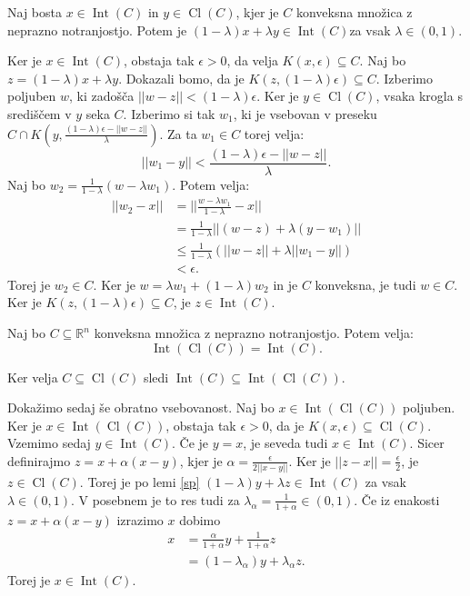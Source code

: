 \documentclass[mat1]{fmfdelo}
\newcommand{\R}{\mathbb R}
\DeclareMathOperator{\Int}{Int}
\DeclareMathOperator{\Cl}{Cl}
\begin{document}
\begin{lema}\label{sp}
	Naj bosta $x \in \Int(C)$ in $y \in \Cl(C)$, kjer je $C$ konveksna množica z neprazno notranjostjo. Potem je $(1-\lambda)x + \lambda y \in \Int(C) $za vsak $\lambda \in (0,1).$
\end{lema}

\begin{dokaz}
	Ker je $x \in \Int(C)$, obstaja tak $\epsilon > 0$, da velja $K(x, \epsilon) \subseteq C$. Naj bo $z = (1-\lambda)x + \lambda y$. Dokazali bomo, da je $K(z, (1-\lambda)\epsilon) \subseteq C$. Izberimo poljuben $w$, ki zadošča $||w-z|| < (1-\lambda)\epsilon$. Ker je $y\in \Cl(C)$, vsaka krogla s središčem v $y$ seka $C$. Izberimo si tak $w_1$, ki je vsebovan v preseku $C \cap K(y, \frac{(1-\lambda)\epsilon-||w-z||}{\lambda})$. Za ta $w_1 \in C$ torej velja:
	$$ ||w_1 - y|| < \frac{(1-\lambda)\epsilon - ||w-z||}{\lambda}.$$
	Naj bo $w_2 = \frac{1}{1-\lambda}(w - \lambda w_1)$. Potem velja: 
	\begin{align*}
	||w_2 -x|| &= \bigg|\bigg|\frac{w-\lambda w_1}{1-\lambda} - x\bigg|\bigg| \\
	&=\frac{1}{1-\lambda}||(w-z) + \lambda(y - w_1)|| \\
	&\le \frac{1}{1-\lambda}(||w-z|| + \lambda||w_1 - y||) \\
	&< \epsilon.
	\end{align*}
	Torej je $w_2 \in C$. Ker je $w = \lambda w_1 + (1-\lambda)w_2$ in je $C$ konveksna, je tudi $w \in C$. Ker je $K(z, (1-\lambda)\epsilon) \subseteq C$, je $z \in \Int(C).$
\end{dokaz}




\begin{lema}
	Naj bo $C \subseteq \R^n$ konveksna množica z neprazno notranjostjo. Potem velja: 
	$$ \Int(\Cl(C)) = \Int(C).$$
\end{lema}

\begin{dokaz}
	Ker velja $C \subseteq \Cl(C)$ sledi $\Int(C) \subseteq \Int (\Cl(C))$. 
	
	
	Dokažimo sedaj še obratno vsebovanost. Naj bo $x \in \Int(\Cl(C))$ poljuben. Ker je $x \in \Int(\Cl(C))$, obstaja tak $\epsilon > 0$, da je $K(x, \epsilon) \subseteq \Cl(C)$. Vzemimo sedaj $y \in \Int(C)$. Če je $y = x$, je seveda tudi $ x \in \Int(C)$. Sicer definirajmo $z = x + \alpha(x - y)$, kjer je $\alpha = \frac{\epsilon}{2||x-y||}$. Ker je $||z-x|| = \frac{\epsilon}{2}$, je $z \in \Cl(C)$. Torej je po lemi \ref{sp} $(1-\lambda)y + \lambda z \in \Int(C)$ za  vsak $\lambda \in (0,1)$. V posebnem je to res tudi za $\lambda_\alpha = \frac{1}{1+\alpha} \in (0,1)$. Če iz enakosti $z = x + \alpha(x - y)$ izrazimo $x$ dobimo 
	\begin{align*}
	x &= \frac{\alpha}{1+\alpha}y +\frac{1}{1+\alpha} z\\
	&= (1-\lambda_{\alpha})y + \lambda_{\alpha}z.
	\end{align*}
	Torej je $x \in \Int(C)$.   
\end{dokaz}
\end{document}
